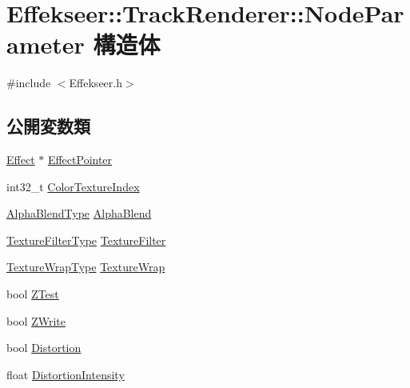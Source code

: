 \hypertarget{struct_effekseer_1_1_track_renderer_1_1_node_parameter}{}\section{Effekseer\+:\+:Track\+Renderer\+:\+:Node\+Parameter 構造体}
\label{struct_effekseer_1_1_track_renderer_1_1_node_parameter}


{\ttfamily \#include $<$Effekseer.\+h$>$}

\subsection*{公開変数類}
\begin{DoxyCompactItemize}
\item 
\mbox{\hyperlink{class_effekseer_1_1_effect}{Effect}} $\ast$ \mbox{\hyperlink{struct_effekseer_1_1_track_renderer_1_1_node_parameter_a00ceee28cf8cea7044e4ad1f57b77638}{Effect\+Pointer}}
\item 
int32\+\_\+t \mbox{\hyperlink{struct_effekseer_1_1_track_renderer_1_1_node_parameter_af56f97c8a66ba32dcbdd511de20101bd}{Color\+Texture\+Index}}
\item 
\mbox{\hyperlink{namespace_effekseer_a8c32fd5b7ec7feed73314b2ae8086949}{Alpha\+Blend\+Type}} \mbox{\hyperlink{struct_effekseer_1_1_track_renderer_1_1_node_parameter_a7de609e147614ce59ff02c45e94659ed}{Alpha\+Blend}}
\item 
\mbox{\hyperlink{namespace_effekseer_ae3518502cfcb4ec4991f13c0b3e4c6ee}{Texture\+Filter\+Type}} \mbox{\hyperlink{struct_effekseer_1_1_track_renderer_1_1_node_parameter_a4fbe911478d0134f0400648deca18a6e}{Texture\+Filter}}
\item 
\mbox{\hyperlink{namespace_effekseer_a5320c83784602974b6278bf1a77b58a3}{Texture\+Wrap\+Type}} \mbox{\hyperlink{struct_effekseer_1_1_track_renderer_1_1_node_parameter_ac5097e042b8ed3d64d7e3724ea43ba9d}{Texture\+Wrap}}
\item 
bool \mbox{\hyperlink{struct_effekseer_1_1_track_renderer_1_1_node_parameter_a28fd38571670062a60b8ea12128c9ff7}{Z\+Test}}
\item 
bool \mbox{\hyperlink{struct_effekseer_1_1_track_renderer_1_1_node_parameter_aee94934faee558a0c2ee1750b1e1051b}{Z\+Write}}
\item 
bool \mbox{\hyperlink{struct_effekseer_1_1_track_renderer_1_1_node_parameter_a2f69bb5e61c65a48a65b48a2c05cafb7}{Distortion}}
\item 
float \mbox{\hyperlink{struct_effekseer_1_1_track_renderer_1_1_node_parameter_a0fa3df9fb51fd6446dd3d5aaaacd0533}{Distortion\+Intensity}}
\end{DoxyCompactItemize}


